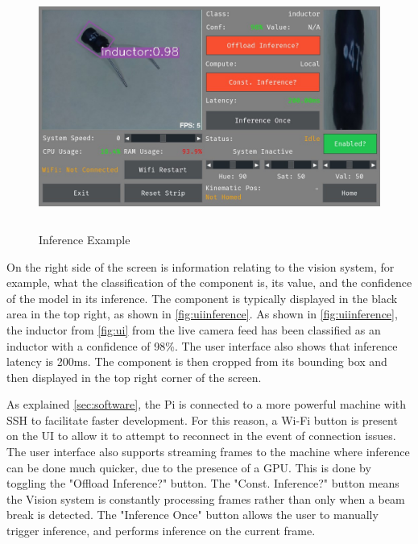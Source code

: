 \begin{figure}[H]
    \hfill
    \begin{minipage}[t]{\textwidth}
      \centering
      \includegraphics[height=8cm]{imgs/software/screeninference.jpg}
      \caption{Inference Example}
      \label{fig:uiinference}
    \end{minipage}
\end{figure}

On the right side of the screen is information relating to the vision system, for example, what the classification of the component is, its value, and the confidence of the model in its inference. The component is typically displayed in the black area in the top right, as shown in \autoref{fig:uiinference}. As shown in \autoref{fig:uiinference}, the inductor from \autoref{fig:ui} from the live camera feed has been classified as an inductor with a confidence of 98\%. The user interface also shows that inference latency is 200ms. The component is then cropped from its bounding box and then displayed in the top right corner of the screen.

As explained \autoref{sec:software}, the Pi is connected to a more powerful machine with SSH to facilitate faster development. For this reason, a Wi-Fi button is present on the UI to allow it to attempt to reconnect in the event of connection issues. The user interface also supports streaming frames to the machine where inference can be done much quicker, due to the presence of a GPU. This is done by toggling the "Offload Inference?" button. The "Const. Inference?" button means the Vision system is constantly processing frames rather than only when a beam break is detected. The "Inference Once" button allows the user to manually trigger inference, and performs inference on the current frame. 

